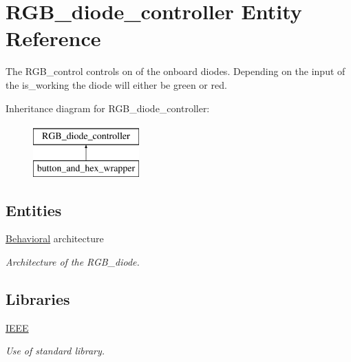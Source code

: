 \hypertarget{classRGB__diode__controller}{\section{R\-G\-B\-\_\-diode\-\_\-controller Entity Reference}
\label{classRGB__diode__controller}
}


The R\-G\-B\-\_\-control controls on of the onboard diodes. Depending on the input of the is\-\_\-working the diode will either be green or red.  


Inheritance diagram for R\-G\-B\-\_\-diode\-\_\-controller\-:\begin{figure}[H]
\begin{center}
\leavevmode
\includegraphics[height=2.000000cm]{classRGB__diode__controller}
\end{center}
\end{figure}
\subsection*{Entities}
\begin{DoxyCompactItemize}
\item 
\hyperlink{classRGB__diode__controller_1_1Behavioral}{Behavioral} architecture
\begin{DoxyCompactList}\small\item\em Architecture of the R\-G\-B\-\_\-diode. \end{DoxyCompactList}\end{DoxyCompactItemize}
\subsection*{Libraries}
 \begin{DoxyCompactItemize}
\item 
\hypertarget{classRGB__diode__controller_ae4f03c286607f3181e16b9aa12d0c6d4}{\hyperlink{classRGB__diode__controller_ae4f03c286607f3181e16b9aa12d0c6d4}{I\-E\-E\-E} }\label{classRGB__diode__controller_ae4f03c286607f3181e16b9aa12d0c6d4}

\begin{DoxyCompactList}\small\item\em Use of standard library. \end{DoxyCompactList}\end{DoxyCompactItemize}
